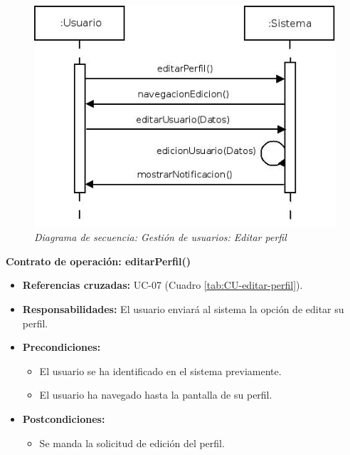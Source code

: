 \begin{figure}[H]
\centering
  \includegraphics[scale=.55]{img/secuencias/gestion-usuarios-editar-perfil.jpeg}
  \caption{\textit{Diagrama de secuencia: Gestión de usuarios: Editar perfil}}
  \label{fig:secuencia-gestion-usuarios-editar-perfil}
\end{figure}

\textbf{Contrato de operación: editarPerfil()}
\begin{itemize}
\item \textbf{Referencias cruzadas:} UC-07 (Cuadro \ref{tab:CU-editar-perfil}).
\item \textbf{Responsabilidades:} El usuario enviará al sistema la opción de editar su perfil.
\item \textbf{Precondiciones:} 
 \begin{itemize}
\item El usuario se ha identificado en el sistema previamente.
\item El usuario ha navegado hasta la pantalla de su perfil.
\end {itemize}
\item \textbf{Postcondiciones:} 
 \begin{itemize}
\item Se manda la solicitud de edición del perfil.
\end {itemize}
\end {itemize}

